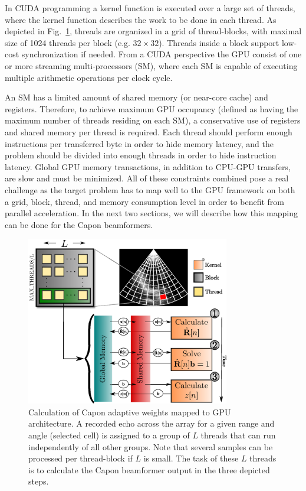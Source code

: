 In CUDA programming a kernel function is executed over a large set of threads, where the kernel function describes the work to be done in each thread. As depicted in Fig.\ \ref{II_fig:gpulayout}, threads are organized in a grid of thread-blocks, with maximal size of 1024 threads per block (e.g. $32\times32$). Threads inside a block support low-cost synchronization if needed. From a CUDA perspective the GPU consist of one or more streaming multi-processors (SM), where each SM is capable of executing multiple arithmetic operations per clock cycle.

An SM has a limited amount of shared memory (or near-core cache) and registers. Therefore, to achieve maximum GPU occupancy (defined as having the maximum number of threads residing on each SM), a conservative use of registers and shared memory per thread is required. Each thread should perform enough instructions per transferred byte in order to hide memory latency, and the problem should be divided into enough threads in order to hide instruction latency. Global GPU memory transactions, in addition to CPU-GPU transfers, are slow and must be minimized. All of these constraints combined pose a real challenge as the target problem has to map well to the GPU framework on both a grid, block, thread, and memory consumption level in order to benefit from parallel acceleration. In the next two sections, we will describe how this mapping can be done for the Capon beamformers.    

\begin{figure}
\centerline{\includegraphics[width=3.5in]{gfx/gpu_layout_vertical_2.eps}}
\caption{Calculation of Capon adaptive weights mapped to GPU architecture. A recorded echo across the array for a given range and angle (selected cell) is assigned to a group of $L$ threads that can run independently of all other groups. Note that several samples can be processed per thread-block if $L$ is small. The task of these $L$ threads is to calculate the Capon beamformer output in the three depicted steps.}
\label{II_fig:gpulayout}
\end{figure}

